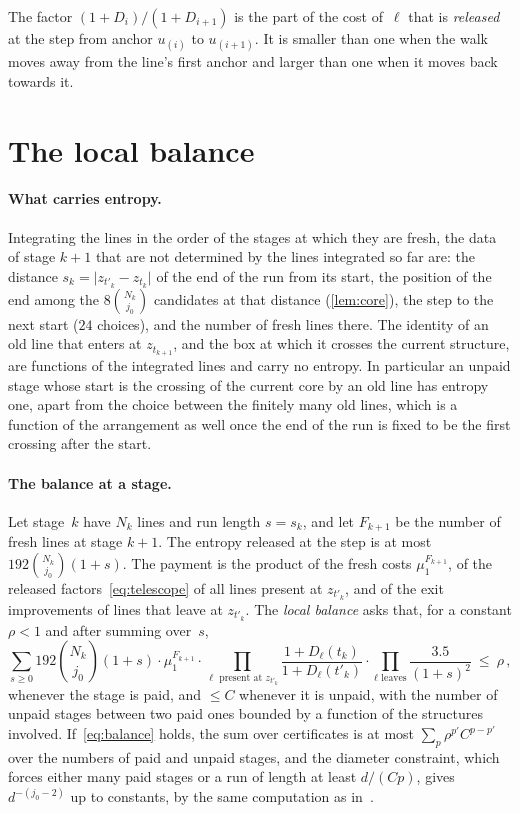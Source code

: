\documentclass[11pt,letterpaper]{article}
\begin{document}
The factor $(1+D_i)/(1+D_{i+1})$ is the part of the cost of~$\ell$ that is \emph{released} at the step from anchor $u_{(i)}$ to $u_{(i+1)}$. It is smaller than one when the walk moves away from the line's first anchor and larger than one when it moves back towards it.

\section{The local balance}
\label{sec:balance}

\paragraph{What carries entropy.} Integrating the lines in the order of the stages at which they are fresh, the data of stage $k+1$ that are not determined by the lines integrated so far are: the distance $s_k=\lvert z_{t'_k}-z_{t_k}\rvert$ of the end of the run from its start, the position of the end among the $8\binom{N_k}{j_0}$ candidates at that distance (\cref{lem:core}), the step to the next start ($24$ choices), and the number of fresh lines there. The identity of an old line that enters at $z_{t_{k+1}}$, and the box at which it crosses the current structure, are functions of the integrated lines and carry no entropy. In particular an unpaid stage whose start is the crossing of the current core by an old line has entropy one, apart from the choice between the finitely many old lines, which is a function of the arrangement as well once the end of the run is fixed to be the first crossing after the start.

\paragraph{The balance at a stage.} Let stage~$k$ have $N_k$ lines and run length $s=s_k$, and let $F_{k+1}$ be the number of fresh lines at stage $k+1$. The entropy released at the step is at most $192\binom{N_k}{j_0}(1+s)$. The payment is the product of the fresh costs $\mu_1^{F_{k+1}}$, of the released factors~\eqref{eq:telescope} of all lines present at $z_{t'_k}$, and of the exit improvements of lines that leave at $z_{t'_k}$. The \emph{local balance} asks that, for a constant $\rho<1$ and after summing over~$s$,
\begin{equation}
\label{eq:balance}
  \sum_{s\ge0}192\binom{N_k}{j_0}(1+s)\cdot\mu_1^{F_{k+1}}\cdot\prod_{\ell\text{ present at }z_{t'_k}}\frac{1+D_\ell(t_k)}{1+D_\ell(t'_k)}\cdot\prod_{\ell\text{ leaves}}\frac{3.5}{(1+s)^2}\ \le\ \rho\,,
\end{equation}
whenever the stage is paid, and $\le C$ whenever it is unpaid, with the number of unpaid stages between two paid ones bounded by a function of the structures involved. If~\eqref{eq:balance} holds, the sum over certificates is at most $\sum_p\rho^{p'}C^{p-p'}$ over the numbers of paid and unpaid stages, and the diameter constraint, which forces either many paid stages or a run of length at least $d/(Cp)$, gives $d^{-(j_0-2)}$ up to constants, by the same computation as in~\cite[Section~3]{SC26}.
\end{document}
